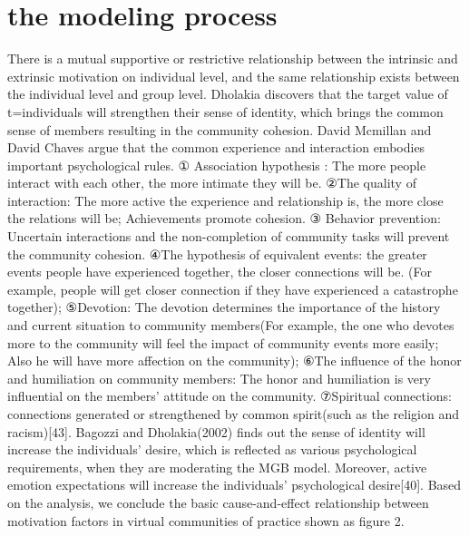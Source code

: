 \documentclass{elsarticle}
\begin{document}
\section{the modeling process}
\label{sec:modeling-process}

There is a mutual supportive or restrictive relationship between the
intrinsic and extrinsic motivation on individual level, and the same
relationship exists between the individual level and group
level. Dholakia discovers that the target value of t=individuals will
strengthen their sense of identity, which brings the common sense of
members resulting in the community cohesion. David Mcmillan and David
Chaves argue that the common experience and interaction embodies
important psychological rules. ① Association hypothesis : The more
people interact with each other, the more intimate they will be. ②The
quality of interaction: The more active the experience and
relationship is, the more close the relations will be; Achievements
promote cohesion. ③ Behavior prevention: Uncertain interactions and
the non-completion of community tasks will prevent the community
cohesion. ④The hypothesis of equivalent events: the greater events
people have experienced together, the closer connections will be. (For
example, people will get closer connection if they have experienced a
catastrophe together); ⑤Devotion: The devotion determines the
importance of the history and current situation to community
members(For example, the one who devotes more to the community will
feel the impact of community events more easily; Also he will have
more affection on the community); ⑥The influence of the honor and
humiliation on community members: The honor and humiliation is very
influential on the members’ attitude on the community. ⑦Spiritual
connections: connections generated or strengthened by common
spirit(such as the religion and racism)[43]. Bagozzi and
Dholakia(2002) finds out the sense of identity will increase the
individuals’ desire, which is reflected as various psychological
requirements, when they are moderating the MGB model. Moreover, active
emotion expectations will increase the individuals’ psychological
desire[40]. Based on the analysis, we conclude the basic
cause-and-effect relationship between motivation factors in virtual
communities of practice shown as figure 2.
\end{document}
